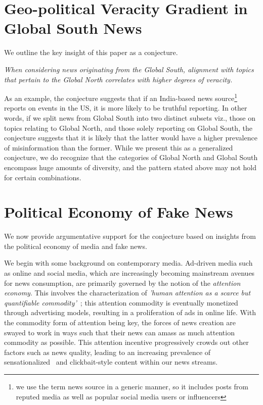 \documentclass[runningheads]{llncs}
\begin{document}

\section{Geo-political Veracity Gradient in Global South News}\label{sec:conjecture}

We outline the key insight of this paper as a conjecture. 

\vspace{0.1in}
{\it When considering news originating from the Global South, alignment with topics that pertain to the Global North correlates with higher degrees of veracity. }
\vspace{0.1in}

As an example, the conjecture suggests that if an India-based news source\footnote{we use the term news source in a generic manner, so it includes posts from reputed media as well as popular social media users or influencers} reports on events in the US, it is more likely to be truthful reporting. In other words, if we split news from Global South into two distinct subsets viz., those on topics relating to Global North, and those solely reporting on Global South, the conjecture suggests that it is likely that the latter would have a higher prevalence of misinformation than the former. While we present this as a generalized conjecture, we do recognize that the categories of Global North and Global South encompass huge amounts of diversity, and the pattern stated above may not hold for certain combinations. 

\section{Political Economy of Fake News}

We now provide argumentative support for the conjecture based on insights from the political economy of media and fake news. 

We begin with some background on contemporary media. Ad-driven media such as online and social media, which are increasingly becoming mainstream avenues for news consumption, are primarily governed by the notion of the {\it attention economy}. This involves the characterization of {\it 'human attention as a scarce but quantifiable commodity'}~\cite{crogan2012paying}; this attention commodity is eventually monetized through advertising models, resulting in a proliferation of ads in online life. With the commodity form of attention being key, the forces of news creation are swayed to work in ways such that their news can amass as much attention commodity as possible. This attention incentive progressively crowds out other factors such as news quality, leading to an increasing prevalence of sensationalized~\cite{hendriks2018proving} and clickbait-style content within our news streams. 
\end{document}
